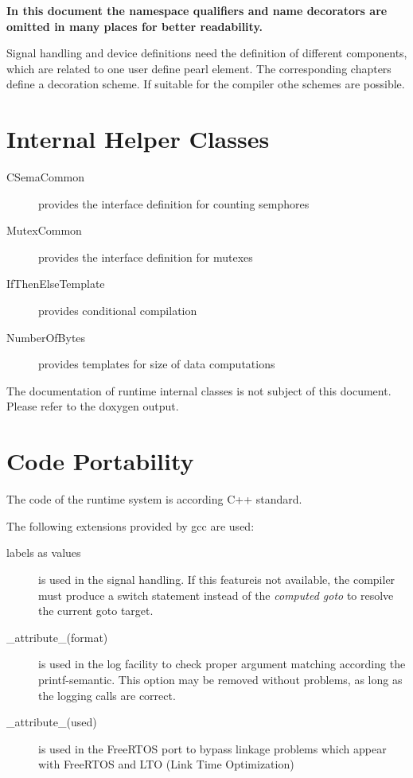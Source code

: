 {\bf 
In this document the namespace qualifiers  and name decorators 
are omitted in many places for better readability.
}

Signal handling and device definitions need the definition of 
different components, which are related to one user define pearl 
element.
The corresponding chapters define a decoration scheme. If suitable
for the compiler othe schemes are possible. 


\section{Internal Helper Classes}
\begin{description}
\item[CSemaCommon]  provides the interface definition for counting semphores
\item[MutexCommon] provides the interface definition for mutexes
\item[IfThenElseTemplate] provides conditional compilation
\item[NumberOfBytes] provides templates for size of data computations
\end{description}
The documentation of runtime internal classes is not subject of this document.
Please refer to the doxygen output.

\section{Code Portability}
The code of the runtime system is according C++ standard.

The following extensions provided by gcc are used:
\begin{description}
\item[labels as values] is used in the signal handling. 
   If this featureis not available, the compiler must produce a switch 
   statement instead of the {\em computed goto} to resolve
   the current goto target.
\item[\_attribute\_(format)] is used in the log facility to check
   proper argument matching according the printf-semantic.
   This option may be removed without problems, as long as the logging
   calls are correct.
\item[\_attribute\_(used)] is used in the FreeRTOS port to bypass linkage
   problems which appear with FreeRTOS and LTO (Link Time Optimization)
\end{description}
   
